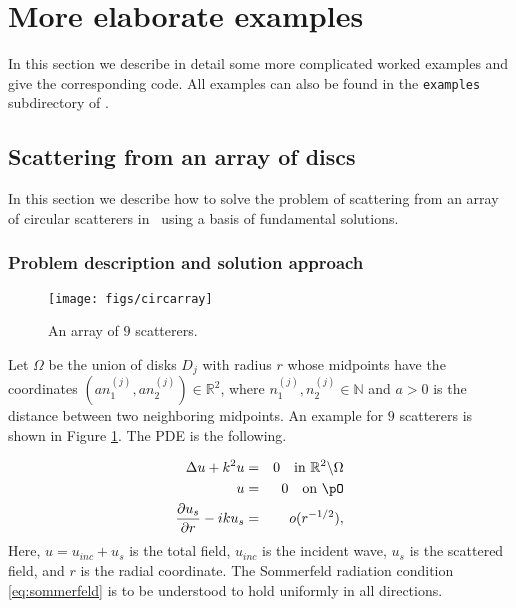 \section{More elaborate examples}
\label{s:exa}

In this section we describe in detail some more complicated
worked examples and give the corresponding code.
All examples can also be found in the
{\texttt{examples}} subdirectory of \mpspack.


\subsection{Scattering from an array of discs}

In this section we describe how to solve the problem of scattering
from an array of circular scatterers in \mpspack\ using a basis of
fundamental solutions.

\subsubsection{Problem description and solution approach}

\begin{figure}
\center
\texttt{[image: figs/circarray]}
\caption{An array of $9$ scatterers.}
\label{fig:circarray}
\end{figure}

Let $\Omega$ be the union of disks $D_j$ with radius $r$ whose
midpoints have the coordinates $(an_1^{(j)},an_2^{(j)})\in\mathbb{R}^2$, where
$n_1^{(j)},n_2^{(j)}\in\mathbb{N}$ and $a>0$ is the distance between
two neighboring midpoints. An example for $9$ scatterers is shown in Figure
\ref{fig:circarray}. The PDE is the following.
 
\begin{eqnarray}
\Delta u+k^2u & = & 0  \quad \text{in
}\mathbb{R}^2\backslash\Omega\label{eq:helm0}\\
u&=&0 \quad \text{on } \pO \label{eq:soundsoft0}\\
\frac{\partial u_s}{\partial r}-iku_s & = & o(r^{-1/2}),\label{eq:sommerfeld0}
\end{eqnarray}
Here, $u=u_{inc}+u_s$ is the total field, $u_{inc}$ is the incident
wave, $u_s$ is the scattered field, and $r$ is the radial coordinate.
The Sommerfeld radiation condition
\eqref{eq:sommerfeld} is to be understood to hold uniformly in all
directions. 


